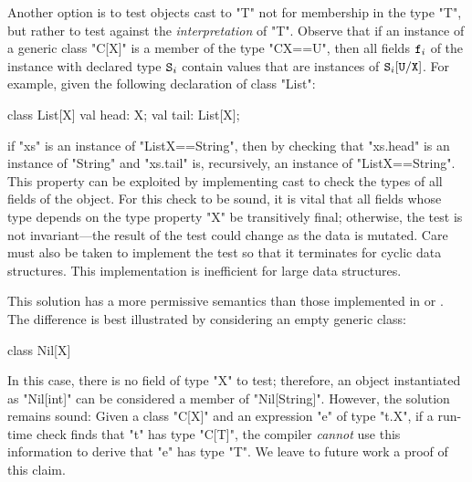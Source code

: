Another option is to test objects cast to \xcd"T" not for membership in the
type \xcd"T", but rather to test against the
\emph{interpretation} of \xcd"T".
Observe that
if an instance of a generic class \xcd"C[X]"
is a member of the type \xcd"C{X==U}", then
all fields ${\tt f}_i$ of the instance with
declared type ${\tt S}_i$ contain values
that are instances of ${\tt S}_i[{\tt U}/{\tt X}]$.
For example, given the following declaration of class \xcd"List":
{
\begin{xten}
class List[X] {
  val head: X;
  val tail: List[X];
}
\end{xten}
}
\noindent
if \xcd"xs" is an instance of \xcd"List{X==String}", then
by checking that \xcd"xs.head" is an instance of \xcd"String"
and \xcd"xs.tail" is, recursively, an instance of \xcd"List{X==String}".
This property can be exploited by implementing cast to check the
types of all fields of the object.
For this check to be sound, it is vital that all fields whose
type depends on the type property \xcd"X" be transitively final;
otherwise, the test is not invariant---the
result of the test could change as the data is mutated.
Care must also be taken to implement the
test so that it terminates for cyclic data structures.
This implementation is inefficient for large data structures.

This solution has a more permissive semantics
than those implemented in \Xten or .
The difference is best illustrated by considering an empty generic class:
{
\begin{xten}
class Nil[X] { }
\end{xten}
}
\noindent
In this case, there is no field of type \xcd"X" to test;
therefore, an object instantiated as \xcd"Nil[int]" 
can be considered a member of \xcd"Nil[String]". 
However, the solution remains sound:
Given a class \xcd"C[X]" and an expression \xcd"e" of type \xcd"t.X", if
a run-time check finds that \xcd"t" has type \xcd"C[T]", 
the compiler \emph{cannot} use this information to derive 
that \xcd"e" has type \xcd"T".
We leave to future work a proof of this claim.
